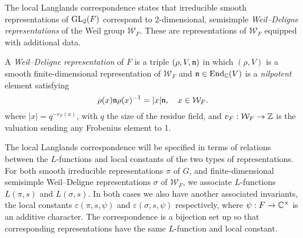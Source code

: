 The local Langlands correspondence states that irreducible smooth representations of $\mathrm{GL}_2(F)$ correspond to 2-dimensional, semisimple \emph{Weil--Deligne representations} of the Weil group $\mathcal{W}_F$. These are representations of $\mathcal{W}_F$ equipped with additional data.
\begin{defn}
	A \emph{Weil--Deligne representation} of $F$ is a triple $(\rho,V,\mathfrak{n})$ in which $(\rho,V)$ is a smooth finite-dimensional representation of $\mathcal{W}_F$ and $\mathfrak{n}\in\mathrm{End}_{\mathbb{C}}(V)$ is a \textit{nilpotent} element satisfying
	$$\rho(x)\mathfrak{n}\rho(x)^{-1}=|x|\mathfrak{n},\quad x\in \mathcal{W}_F.$$
	where $|x| = q^{-v_F(x)}$, with $q$ the size of the residue field, and $v_F:\mathcal{W}_F\to \mathbb{Z}$ is the valuation sending any Frobenius element to 1.
\end{defn}


The local Langlands correspondence will be specified in terms of relations between the $L$-functions and local constants of the two types of representations. For both smooth irreducible representations $\pi$ of $G$, and finite-dimensional semisimple Weil--Deligne representations $\sigma$ of $\mathcal{W}_F$, we associate $L$-functions $L(\pi, s)$ and $L(\sigma, s)$. In both cases we also have another associated invariants, the local constants $\varepsilon(\pi, s, \psi)$ and $\varepsilon(\sigma, s, \psi)$ respectively, where $\psi: F\to \mathbb{C}^\times$ is an additive character. The correspondence is a bijection set up so that corresponding representations have the same $L$-function and local constant.

